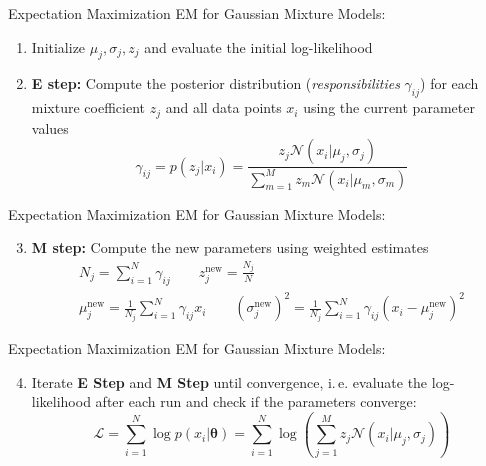 \begin{frame}{Expectation Maximization}{}
EM for Gaussian Mixture Models:
	\begin{enumerate}
		\item Initialize $\mu_j, \sigma_j, z_j$ and evaluate the initial log-likelihood
		\item \textbf{E step:} Compute the posterior distribution (\textit{responsibilities} $\gamma_{ij}$) for each mixture coefficient $z_j$ and all data points $x_i$ using the current parameter values
		\begin{equation}
			\gamma_{ij} = p(z_j|x_i) = \frac{z_j \mathcal{N}(x_i|\mu_j, \sigma_j)}{\sum_{m=1}^M z_m \mathcal{N}(x_i|\mu_m, \sigma_m)}
		\end{equation}
	\end{enumerate}
\end{frame}

\begin{frame}{Expectation Maximization}{}
EM for Gaussian Mixture Models:
	\begin{enumerate}
		\setcounter{enumi}{2}
		\item \textbf{M step:} Compute the new parameters using weighted estimates\\
		\begin{gather}
			N_j = \sum_{i=1}^N \gamma_{ij} \qquad z_{j}^{\text{new}} = \frac{N_j}{N}\\
			\mu_j^{\text{new}} = \frac{1}{N_j} \sum_{i=1}^N \gamma_{ij} x_i \qquad (\sigma_j^{\text{new}})^2 = \frac{1}{N_j} \sum_{i=1}^N \gamma_{ij} (x_i - \mu_j^{\text{new}})^2
		\end{gather}
	\end{enumerate}
\end{frame}

\begin{frame}{Expectation Maximization}{}
EM for Gaussian Mixture Models:
	\begin{enumerate}
		\setcounter{enumi}{3}
		\item Iterate \textbf{E Step} and \textbf{M Step} until convergence, i.\,e. evaluate the log-likelihood after each run and check if the parameters converge:
		\begin{equation}
			\mathcal{L} = \sum_{i=1}^N \log p(x_i|\bm{\theta}) = \sum_{i=1}^N \log\left(\sum_{j=1}^M z_j \mathcal{N}(x_i|\mu_j, \sigma_j)\right)
		\end{equation}
	\end{enumerate}
\end{frame}

